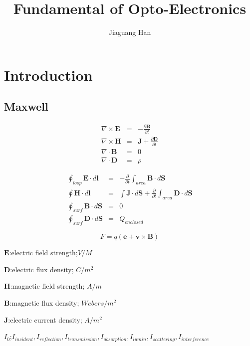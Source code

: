 \documentclass[12pt]{book} %
\title{Fundamental of Opto-Electronics}
\author{Jiaguang Han}
\begin{document}
\maketitle

\chapter{Introduction}

\section{Maxwell}
\begin{eqnarray}
  \nabla\times\mathbf{E} &=& -\frac{\partial\mathbf{B}}{\partial t} \\
  \nabla\times\mathbf{H} &=& \mathbf{J}+\frac{\partial\mathbf{D}}{\partial t} \\
  \nabla\cdot\mathbf{B} &=& 0 \\
  \nabla\cdot\mathbf{D} &=& \rho
\end{eqnarray}

\begin{eqnarray}
  \oint_{loop}\mathbf{E}\cdot d\mathbf{l} &=& -\frac{\partial}{\partial t}\int_{area}\mathbf{B}\cdot d\mathbf{S} \\
  \oint\mathbf{H}\cdot d\mathbf{l} &=& \int\mathbf{J}\cdot d\mathbf{S}+\frac{\partial}{\partial t}\int_{area}\mathbf{D}\cdot d\mathbf{S} \\
  \oint_{surf}\mathbf{B}\cdot d\mathbf{S} &=& 0 \\
  \oint_{surf}\mathbf{D}\cdot d\mathbf{S} &=& Q_{enclosed}
\end{eqnarray}

\begin{equation}\label{equa:lorrents}
  F=q(\mathbf{e}+\mathbf{v}\times\mathbf{B})
\end{equation}

$\mathbf{E}$:electric field strength;$V/M$

$\mathbf{D}$:electric flux density; $C/m^2$

$\mathbf{H}$:magnetic field strength; $A/m$

$\mathbf{B}$:magnetic flux density; $Webers/m^2$

$\mathbf{J}$:electric current density; $A/m^2$

$I_0$;$I_{incident},I_{reflection},I_{transmission},I_{absorption},I_{lumin},I_{scattering},I_{interference}$
\end{document}
